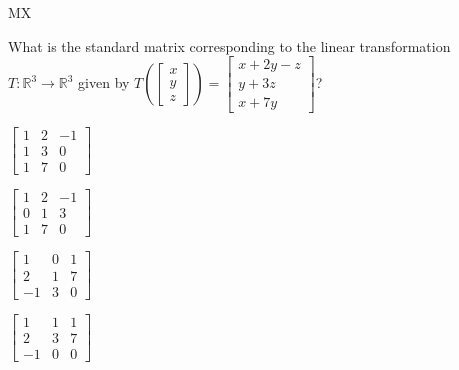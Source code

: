 \documentclass{article}
\newcommand{\IR}{\mathbb{R}}
\begin{document}
\begin{module}{MX}{}
\begin{readinessAssuranceTest}
\item What is the standard matrix corresponding to the linear transformation $T: \IR^3 \rightarrow \IR^3$ given by $T\left( \begin{bmatrix} x \\ y \\ z \end{bmatrix}\right) = \begin{bmatrix} x+2y-z \\ y+3z \\x+7y \end{bmatrix}$?
\begin{multicols}{4}
\begin{readinessAssuranceTestChoices}
\item $\begin{bmatrix} 1 & 2 & -1 \\ 1 & 3 & 0 \\ 1 & 7 & 0 \end{bmatrix}$
\item $\begin{bmatrix} 1 & 2 & -1 \\ 0 & 1 & 3 \\ 1 & 7 & 0 \end{bmatrix}$ %
\item $\begin{bmatrix}  1 & 0 & 1 \\ 2 & 1 & 7 \\ -1 & 3 & 0 \end{bmatrix}$
\item $\begin{bmatrix} 1 & 1 & 1 \\ 2 & 3 & 7 \\ -1 & 0 & 0 \end{bmatrix}$
\end{readinessAssuranceTestChoices}
\end{multicols}


\end{readinessAssuranceTest}
\end{module}
\end{document}

